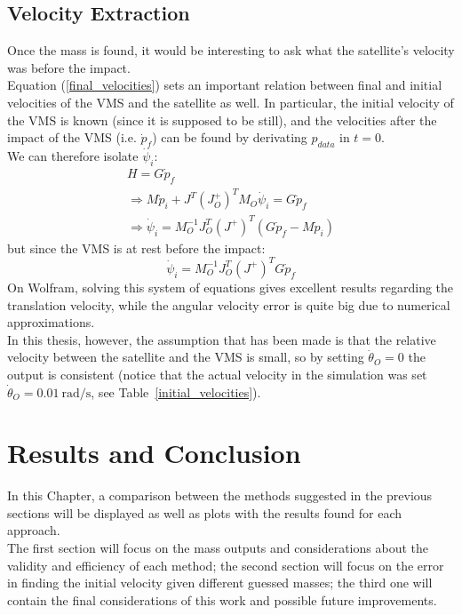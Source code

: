 \documentclass[a4paper,12pt,oneside]{report}
\begin{document}
\section{Velocity Extraction}
Once the mass is found, it would be interesting to ask what the satellite's velocity was before the impact.\\
Equation (\ref{final_velocities}) sets an important relation between final and initial velocities of the VMS and the satellite as well. In particular, the initial velocity of the VMS is known (since it is supposed to be still), and the velocities after the impact of the VMS (i.e. $\dot{p}_f$) can be found by derivating $p_{data}$ in $t=0$.\\
We can therefore isolate $\dot{\psi}_i$:
\begin{equation}
  \begin{array}{l}
    H=G\dot{p}_f\\
    \Rightarrow M\dot{p}_i+J^T(J_O^+)^TM_O\dot{\psi}_i=G\dot{p}_f\\
    \Rightarrow \dot{\psi}_i=M_O^{-1}J_O^T(J^+)^T(G\dot{p}_f-M\dot{p}_i)
  \end{array}
\end{equation}
but since the VMS is at rest before the impact:
\begin{equation}
  \dot{\psi}_i=M_O^{-1}J_O^T(J^+)^TG\dot{p}_f
\end{equation}
On Wolfram, solving this system of equations gives excellent results regarding the translation velocity, while the angular velocity error is quite big due to numerical approximations.\\
In this thesis, however, the assumption that has been made is that the relative velocity between the satellite and the VMS is small, so by setting $\dot{\theta}_O=0$ the output is consistent (notice that the actual velocity in the simulation was set $\dot{\theta}_O=\SI{0.01}{\radian\per\second}$, see Table~\ref{initial_velocities}).
\chapter{Results and Conclusion}
In this Chapter, a comparison between the methods suggested in the previous sections will be displayed as well as plots with the results found for each approach.\\
The first section will focus on the mass outputs and considerations about the validity and efficiency of each method; the second section will focus on the error in finding the initial velocity given different guessed masses; the third one will contain the final considerations of this work and possible future improvements.
\newpage
\end{document}
